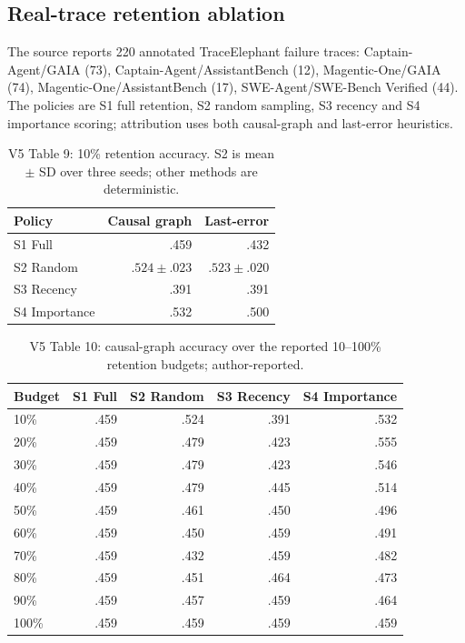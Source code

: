 \subsection{Real-trace retention ablation}
The source reports 220 annotated TraceElephant failure traces:
Captain-Agent/GAIA (73), Captain-Agent/AssistantBench (12),
Magentic-One/GAIA (74), Magentic-One/AssistantBench (17),
SWE-Agent/SWE-Bench Verified (44). The policies are S1 full retention,
S2 random sampling, S3 recency and S4 importance scoring; attribution
uses both causal-graph and last-error heuristics.
\begin{table}[ht]\centering\footnotesize
\caption{V5 Table 9: 10\% retention accuracy. S2 is mean $\pm$ SD over
three seeds; other methods are deterministic.}
\label{tab:v5ret10}
\begin{tabular}{lrr}\toprule
Policy & Causal graph & Last-error\\\midrule
S1 Full & .459 & .432\\
S2 Random & $.524\pm.023$ & $.523\pm.020$\\
S3 Recency & .391 & .391\\
S4 Importance & .532 & .500\\
\bottomrule\end{tabular}\end{table}
\begin{table}[ht]\centering\scriptsize
\caption{V5 Table 10: causal-graph accuracy over the reported
10--100\% retention budgets; author-reported.}
\label{tab:v5retall}
\begin{tabular}{lrrrr}\toprule
Budget & S1 Full & S2 Random & S3 Recency & S4 Importance\\\midrule
10\% & .459 & .524 & .391 & .532\\
20\% & .459 & .479 & .423 & .555\\
30\% & .459 & .479 & .423 & .546\\
40\% & .459 & .479 & .445 & .514\\
50\% & .459 & .461 & .450 & .496\\
60\% & .459 & .450 & .459 & .491\\
70\% & .459 & .432 & .459 & .482\\
80\% & .459 & .451 & .464 & .473\\
90\% & .459 & .457 & .459 & .464\\
100\% & .459 & .459 & .459 & .459\\
\bottomrule\end{tabular}\end{table}

